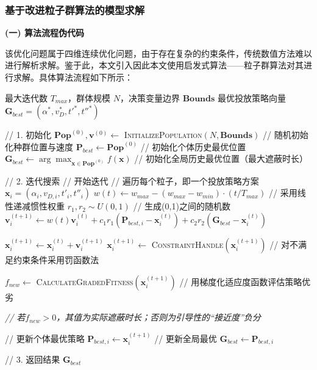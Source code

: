 \documentclass[withoutpreface,bwprint]{cumcmthesis}
\numberwithin{equation}{section} %
\numberwithin{figure}{section} %
\numberwithin{table}{section}  %
\begin{document}
\subsubsection{基于改进粒子群算法的模型求解}
\textbf{(一) 算法流程伪代码}

该优化问题属于四维连续优化问题，由于存在复杂的约束条件，传统数值方法难以进行解析求解。鉴于此，本文引入因此本文使用启发式算法——粒子群算法对其进行求解。具体算法流程如下所示：

\begin{algorithm}[H]
\caption{基于改进粒子群算法的投放策略优化}
\label{alg:pso_for_problem2}
\begin{algorithmic}[1]
    \Require 最大迭代数 $T_{max}$，群体规模 $N$，决策变量边界 $\mathbf{Bounds}$
    \Ensure 最优投放策略向量 $\mathbf{G}_{best} = (\alpha^*, v_D^*, t'^*, t''^*)$
    
    \Statex // 1. 初始化
    \State $\mathbf{Pop}^{(0)}, \mathbf{v}^{(0)} \leftarrow$ \textsc{InitializePopulation}$(N, \mathbf{Bounds})$ // 随机初始化种群位置与速度
    \State $\mathbf{P}_{best} \leftarrow \mathbf{Pop}^{(0)}$ // 初始化个体历史最优位置
    \State $\mathbf{G}_{best} \leftarrow \arg\max_{\mathbf{x} \in \mathbf{Pop}^{(0)}} f(\mathbf{x})$ // 初始化全局历史最优位置（最大遮蔽时长）
    
    \Statex // 2. 迭代搜索
     // 开始迭代
         // 遍历每个粒子，即一个投放策略方案 $\mathbf{x}_i = (\alpha_i, v_{D,i}, t'_i, t''_i)$
            \State $w(t) \leftarrow w_{max} - (w_{max} - w_{min}) \cdot (t/T_{max})$ // 采用线性递减惯性权重
            \State $r_1, r_2 \sim U(0, 1)$ // 生成(0,1)之间的随机数
            \State $\mathbf{v}_i^{(t+1)} \leftarrow w(t)\mathbf{v}_i^{(t)} + c_1 r_1(\mathbf{P}_{best,i} - \mathbf{x}_i^{(t)}) + c_2 r_2(\mathbf{G}_{best} - \mathbf{x}_i^{(t)})$

            \State $\mathbf{x}_i^{(t+1)} \leftarrow \mathbf{x}_i^{(t)} + \mathbf{v}_i^{(t+1)}$
            \State $\mathbf{x}_i^{(t+1)} \leftarrow$ \textsc{ConstraintHandle}$(\mathbf{x}_i^{(t+1)})$ // 对不满足约束条件采用罚函数法
            \State \parbox[t]{\dimexpr\linewidth-4em}{%
                $f_{new} \leftarrow$ \textsc{CalculateGradedFitness}$(\mathbf{x}_i^{(t+1)})$ // 用梯度化适应度函数评估策略优劣 \strut
                \textit{// 若$f_{new} > 0$，其值为实际遮蔽时长；否则为引导性的“接近度”负分}\strut}
             // 更新个体最优策略
                \State $\mathbf{P}_{best,i} \leftarrow \mathbf{x}_i^{(t+1)}$
                 // 更新全局最优
                    \State $\mathbf{G}_{best} \leftarrow \mathbf{P}_{best,i}$
                \EndIf
            \EndIf
        \EndFor
    \EndFor
    
    \Statex // 3. 返回结果
    \State \Return $\mathbf{G}_{best}$
\end{algorithmic}
\end{algorithm}
\end{document}
